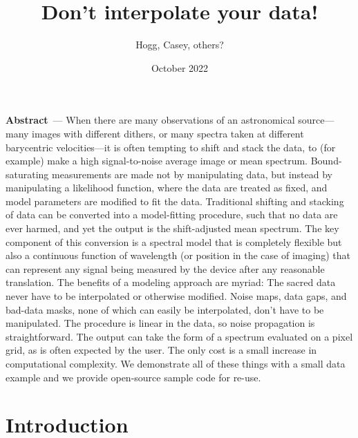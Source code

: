 \documentclass[11pt]{article}
\title{\bfseries%
Don't interpolate your data!}
\author{Hogg, Casey, others?}
\date{October 2022}
\renewcommand{\paragraph}[1]{\medskip\par\noindent\textbf{#1}~---}
\begin{document}
\maketitle

\paragraph{Abstract}
When there are many observations of an astronomical source---many images with different dithers, or many spectra taken at different barycentric velocities---it is often tempting to shift and stack the data, to (for example) make a high signal-to-noise average image or mean spectrum.
Bound-saturating measurements are made not by manipulating data, but instead by manipulating a likelihood function, where the data are treated as fixed, and model parameters are modified to fit the data.
Traditional shifting and stacking of data can be converted into a model-fitting procedure, such that no data are ever harmed, and yet the output is the shift-adjusted mean spectrum.
The key component of this conversion is a spectral model that is completely flexible but also a continuous function of wavelength (or position in the case of imaging) that can represent any signal being measured by the device after any reasonable translation.
The benefits of a modeling approach are myriad:
The sacred data never have to be interpolated or otherwise modified.
Noise maps, data gaps, and bad-data masks, none of which can easily be interpolated, don't have to be manipulated.
The procedure is linear in the data, so noise propagation is straightforward.
The output can take the form of a spectrum evaluated on a pixel grid, as is often expected by the user.
The only cost is a small increase in computational complexity.
We demonstrate all of these things with a small data example and we provide open-source sample code for re-use.

\section{Introduction}
\end{document}
